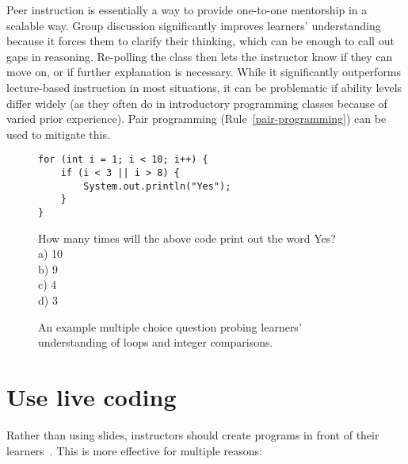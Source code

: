 \documentclass{article}
\begin{document}
Peer instruction is essentially
a way to provide one-to-one mentorship in a scalable way.
Group discussion significantly improves learners' understanding
because it forces them to clarify their thinking,
which can be enough to call out gaps in reasoning.
Re-polling the class then lets the instructor know if they can move on,
or if further explanation is necessary.
While it significantly outperforms lecture-based instruction in most situations,
it can be problematic if ability levels differ widely
(as they often do in introductory programming classes
because of varied prior experience).
Pair programming (Rule~\ref{pair-programming}) can be used to mitigate this.

\begin{figure}\sffamily
\begin{verbatim}
for (int i = 1; i < 10; i++) {
    if (i < 3 || i > 8) {
        System.out.println("Yes");
    }
}
\end{verbatim}
How many times will the above code print out the word Yes?\\
a) 10\\
b) 9\\
c) 4\\
d) 3
\label{fig:mcq}
\caption{An example multiple choice question probing learners' understanding of loops and integer comparisons.}
\end{figure}

\section{Use live coding}\label{live-coding}

Rather than using slides,
instructors should create programs in front of their learners~\citep{rubin-live-coding}.
This is more effective for multiple reasons:
\end{document}
